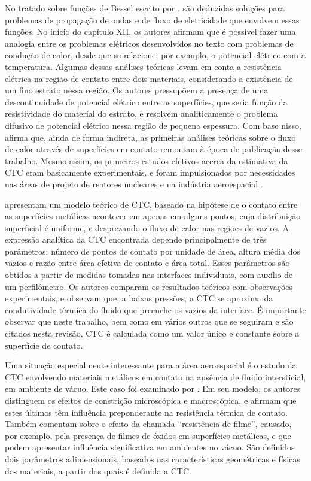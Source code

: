 No tratado sobre funções de Bessel escrito por \cite{livro_bessel}, são deduzidas soluções para problemas de propagação de ondas e de fluxo de
eletricidade que envolvem essas funções. No início do capítulo XII, os autores afirmam que é possível fazer uma analogia entre os problemas
elétricos desenvolvidos no texto com problemas de condução de calor, desde que se relacione, por exemplo, o potencial elétrico com a temperatura. Algumas
dessas análises teóricas levam em conta a resistência elétrica na região de contato entre dois materiais, considerando a existência de um fino
estrato nessa região. Os autores pressupõem a presença de uma descontinuidade de potencial elétrico entre as superfícies,
que seria função da resistividade do material do estrato, e resolvem analiticamente o problema difusivo de potencial elétrico nessa região de pequena espessura. 
Com base nisso, \cite{tese_mikic} afirma que, ainda de forma indireta, as primeiras análises teóricas sobre o fluxo de calor através de superfícies
em contato remontam à época de publicação desse trabalho. Mesmo assim, os primeiros estudos efetivos acerca da estimativa da CTC eram basicamente experimentais,
e foram impulsionados por necessidades nas áreas de projeto de reatores nucleares e na indústria aeroespacial \citep{tese_mikic}.

\cite{artigo_fenech} apresentam um modelo
teórico de CTC, baseado na hipótese de o contato entre as superfícies metálicas acontecer em apenas em alguns pontos, cuja distribuição superficial
é uniforme, e desprezando o fluxo de calor
nas regiões de vazios. A expressão analítica da CTC encontrada depende principalmente de três parâmetros: número de pontos de contato por unidade
de área, altura média dos vazios e razão entre área efetiva de contato e área total. Esses parâmetros são obtidos a partir de medidas tomadas nas
interfaces individuais, com auxílio de um perfilômetro. Os autores comparam os resultados teóricos com observações experimentais, e observam que,
a baixas pressões, a CTC se aproxima da condutividade térmica do fluido que preenche os vazios da interface. É importante observar que neste trabalho, bem como em vários outros que se seguiram e são citados nesta revisão, CTC é calculada como um valor único e constante sobre a superfície de contato.

Uma situação especialmente interessante para a área aeroespacial é o estudo da CTC envolvendo materiais metálicos em contato na ausência de fluido intersticial, em ambiente de vácuo. Este caso foi examinado por \cite{artigo_clausing}.
Em seu modelo, os autores distinguem os efeitos de constrição microscópica e macroscópica, e afirmam que estes últimos têm influência preponderante
na resistência térmica de contato. Também comentam sobre o efeito da chamada ``resistência de filme'', causado, por exemplo, pela presença de
filmes de óxidos em superfícies metálicas, e que podem apresentar influência significativa em ambientes no vácuo. São definidos dois parâmetros adimensionais, baseados nas características geométricas e
físicas dos materiais, a partir dos quais é definida a CTC. 


